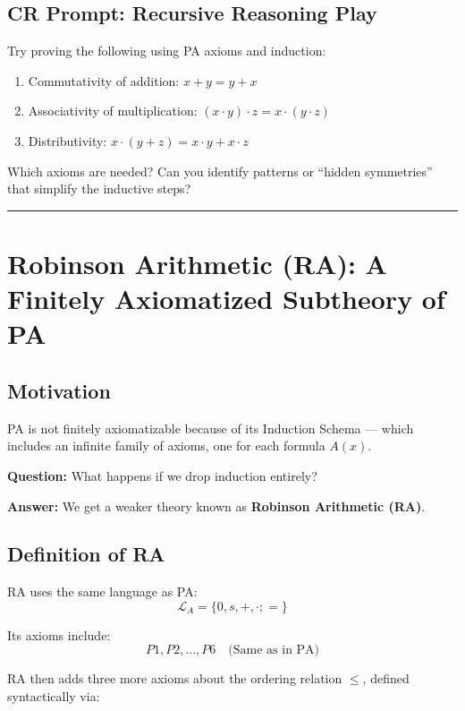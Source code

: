 \documentclass[12pt]{article}
\begin{document}
\subsection*{CR Prompt: Recursive Reasoning Play}

Try proving the following using PA axioms and induction:

\begin{enumerate}
  \item Commutativity of addition: \( x + y = y + x \)
  \item Associativity of multiplication: \( (x \cdot y) \cdot z = x \cdot (y \cdot z) \)
  \item Distributivity: \( x \cdot (y + z) = x \cdot y + x \cdot z \)
\end{enumerate}

Which axioms are needed? Can you identify patterns or “hidden symmetries” that simplify the inductive steps?

\vspace{1em}
\hrule
\vspace{1em}

\section{Robinson Arithmetic (RA): A Finitely Axiomatized Subtheory of PA}

\subsection{Motivation}

PA is not finitely axiomatizable because of its Induction Schema — which includes an infinite family of axioms, one for each formula \( A(x) \).

\textbf{Question:} What happens if we drop induction entirely?

\textbf{Answer:} We get a weaker theory known as \textbf{Robinson Arithmetic (RA)}.

\subsection{Definition of RA}

RA uses the same language as PA:
\[
\mathcal{L}_A = \{0, s, +, \cdot; = \}
\]

Its axioms include:
\[
P1, P2, \dots, P6 \quad \text{(Same as in PA)}
\]

RA then adds three more axioms about the ordering relation \( \leq \), defined syntactically via:
\end{document}
